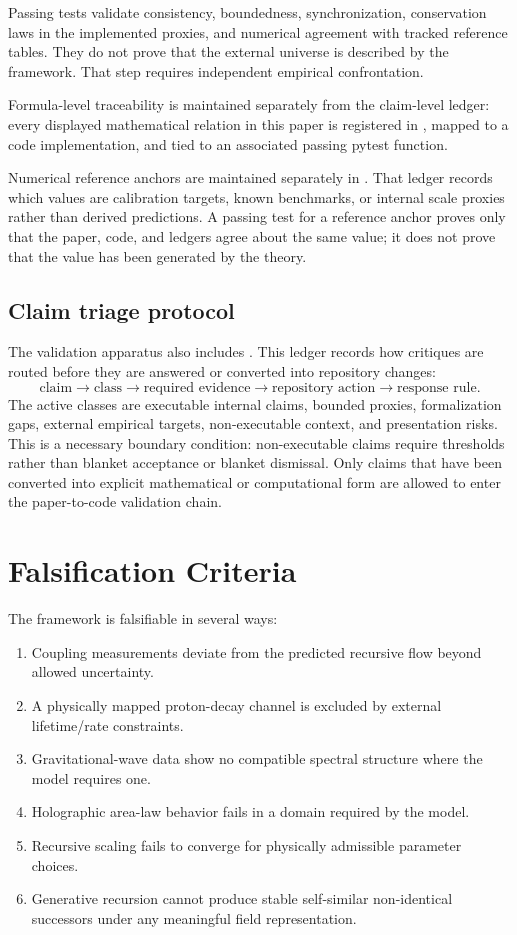 \documentclass[12pt]{article}
\theoremstyle{remark}
\begin{document}
Passing tests validate consistency, boundedness, synchronization, conservation
laws in the implemented proxies, and numerical agreement with tracked reference
tables.  They do not prove that the external universe is described by the
framework.  That step requires independent empirical confrontation.

Formula-level traceability is maintained separately from the claim-level ledger:
every displayed mathematical relation in this paper is registered in
, mapped to a code implementation, and tied to
an associated passing pytest function.

Numerical reference anchors are maintained separately in
.  That ledger records which values are
calibration targets, known benchmarks, or internal scale proxies rather than
derived predictions.  A passing test for a reference anchor proves only that the
paper, code, and ledgers agree about the same value; it does not prove that the
value has been generated by the theory.

\subsection{Claim triage protocol}

The validation apparatus also includes .  This
ledger records how critiques are routed before they are answered or converted
into repository changes:
\[
  \text{claim}\to\text{class}\to\text{required evidence}\to
  \text{repository action}\to\text{response rule}.
\]
The active classes are executable internal claims, bounded proxies,
formalization gaps, external empirical targets, non-executable context, and
presentation risks.  This is a necessary boundary condition: non-executable
claims require thresholds rather than blanket acceptance or blanket dismissal.
Only claims that have been converted into explicit mathematical or
computational form are allowed to enter the paper-to-code validation chain.

\section{Falsification Criteria}

The framework is falsifiable in several ways:
\begin{enumerate}
  \item Coupling measurements deviate from the predicted recursive flow beyond
  allowed uncertainty.
  \item A physically mapped proton-decay channel is excluded by external
  lifetime/rate constraints.
  \item Gravitational-wave data show no compatible spectral structure where the
  model requires one.
  \item Holographic area-law behavior fails in a domain required by the model.
  \item Recursive scaling fails to converge for physically admissible parameter
  choices.
  \item Generative recursion cannot produce stable self-similar non-identical
  successors under any meaningful field representation.
\end{enumerate}
\end{document}
